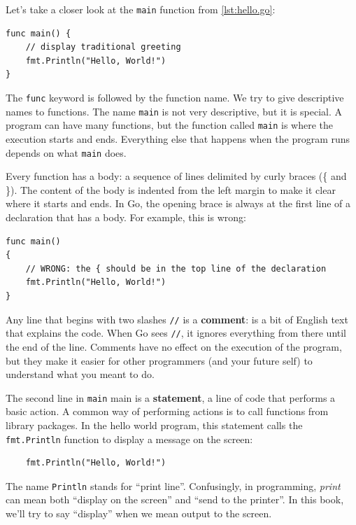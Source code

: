 Let's take a closer look at the {\tt main} function from \ref{lst:hello.go}:

\begin{lstlisting}
func main() {
	// display traditional greeting
	fmt.Println("Hello, World!")
}
\end{lstlisting}


The {\tt func} keyword is followed by the function name. We try to give
descriptive names to functions. The name {\tt main} is not very descriptive,
but it is special. A program can have many functions, but the function called
{\tt main} is where the execution starts and ends. Everything else that
happens when the program runs depends on what {\tt main} does.


Every function has a body: a sequence of lines delimited by curly braces (\{
and \}). The content of the body is indented from the left margin to make it
clear where it starts and ends. In Go, the opening brace is always at the
first line of a declaration that has a body. For example, this is
wrong:

\begin{lstlisting}
func main()
{
	// WRONG: the { should be in the top line of the declaration
	fmt.Println("Hello, World!")
}
\end{lstlisting}


Any line that begins with two slashes {\tt //} is a {\bf comment}: is a bit of
English text that explains the code. When Go sees {\tt //}, it ignores
everything from there until the end of the line. Comments have no effect on
the execution of the program, but they make it easier for other programmers
(and your future self) to understand what you meant to do.

The second line in {\tt main} main is a {\bf statement}, a line of code that
performs a basic action. A common way of performing actions is to call
functions from library packages. In the hello world program, this statement
calls the {\tt fmt.Println} function to display a message on the screen:

\begin{lstlisting}
	fmt.Println("Hello, World!")
\end{lstlisting}

The name {\tt Println} stands for ``print line''. Confusingly, in programming,
{\em print} can mean both ``display on the screen'' and ``send to the
printer''. In this book, we'll try to say ``display'' when we mean output to
the screen.

